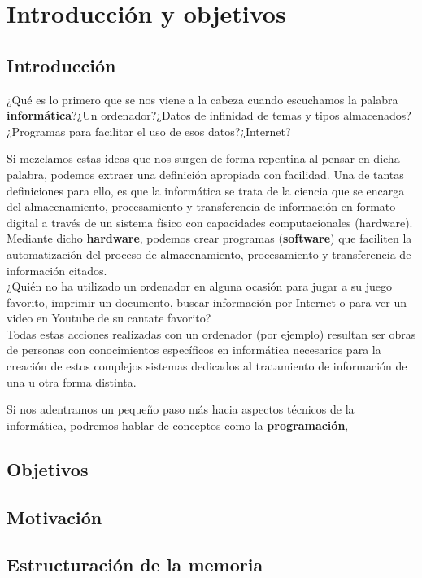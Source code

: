 \chapter[Capítulo 1. Introducción y objetivos]{Introducción y objetivos}

\section{Introducción}

¿Qué es lo primero que se nos viene a la cabeza cuando escuchamos la palabra \textbf{informática}?¿Un ordenador?¿Datos de infinidad de temas y tipos almacenados?¿Programas para facilitar el uso de esos datos?¿Internet?

Si mezclamos estas ideas que nos surgen de forma repentina al pensar en dicha palabra, podemos extraer una definición apropiada con facilidad. Una de tantas definiciones para ello, es que la informática se trata de la ciencia que se encarga del almacenamiento, procesamiento y transferencia de información en formato digital a través de un sistema físico con capacidades computacionales (hardware). Mediante dicho \textbf{hardware}, podemos crear programas (\textbf{software}) que faciliten la automatización del proceso de almacenamiento, procesamiento y transferencia de información citados.\\
¿Quién no ha utilizado un ordenador en alguna ocasión para jugar a su juego favorito, imprimir un documento, buscar información por Internet o para ver un video en Youtube de su cantate favorito?\\
Todas estas acciones realizadas con un ordenador (por ejemplo) resultan ser obras de personas con conocimientos específicos en informática necesarios para la creación de estos complejos sistemas dedicados al tratamiento de información de una u otra forma distinta.

Si nos adentramos un pequeño paso más hacia aspectos técnicos de la informática, podremos hablar de conceptos como la \textbf{programación},

\section{Objetivos}

\section{Motivación}

\section{Estructuración de la memoria}


























